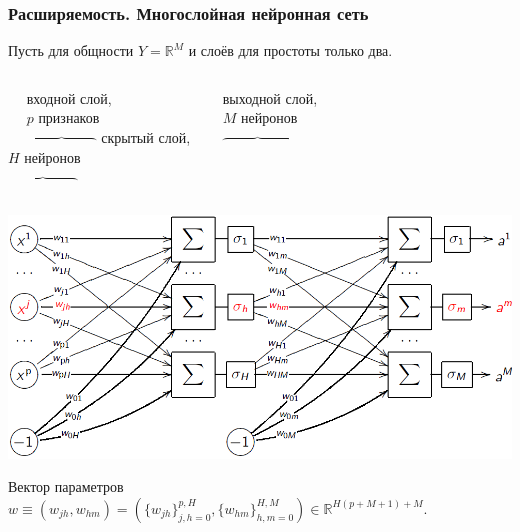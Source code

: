 \documentclass[10pt]{beamer}
\begin{document}
\begin{frame}
\frametitle{Расширяемость. Многослойная нейронная сеть}
Пусть для общности $Y = \mathbb{R}^M$ и слоёв для простоты только два.\\
\vspace{0.4cm} 
\begin{columns}
   $\quad$ входной слой, \\
  $\quad$ $p$ признаков\\
  $\quad$ $\overbrace{\quad \quad \quad \quad \quad}$
     скрытый слой, \\
     $H$ нейронов\\
   $\overbrace{\quad \quad \quad \quad \quad}$
     
     $\,\,\,$ выходной слой, \\
     $\,\,\,$ $M$ нейронов\\
  $\,\,\,$  $\overbrace{\quad \quad \quad \quad \quad}$

\end{columns} 

\begin{center}
	\includegraphics[scale=0.4]{nn2}
	\end{center} 	

Вектор параметров $w \equiv (w_{jh}, w_{hm}) = (\{ w_{jh}\}_{j,h=0}^{p,H}, \{w_{hm}\}_{h,m=0}^{H,M}) \in \mathbb{R}^{H(p+M+1) + M}$.
\end{frame}
\end{document}
